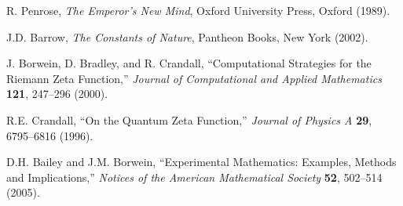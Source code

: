 \documentclass[12pt,a4paper]{article}
\begin{document}
\begin{thebibliography}{99}
 R. Penrose, \emph{The Emperor's New Mind}, Oxford University Press, Oxford (1989).

 J.D. Barrow, \emph{The Constants of Nature}, Pantheon Books, New York (2002).

 J. Borwein, D. Bradley, and R. Crandall, ``Computational Strategies for the Riemann Zeta Function,'' \emph{Journal of Computational and Applied Mathematics} \textbf{121}, 247--296 (2000).

 R.E. Crandall, ``On the Quantum Zeta Function,'' \emph{Journal of Physics A} \textbf{29}, 6795--6816 (1996).

 D.H. Bailey and J.M. Borwein, ``Experimental Mathematics: Examples, Methods and Implications,'' \emph{Notices of the American Mathematical Society} \textbf{52}, 502--514 (2005).

\end{thebibliography}
\end{document}
